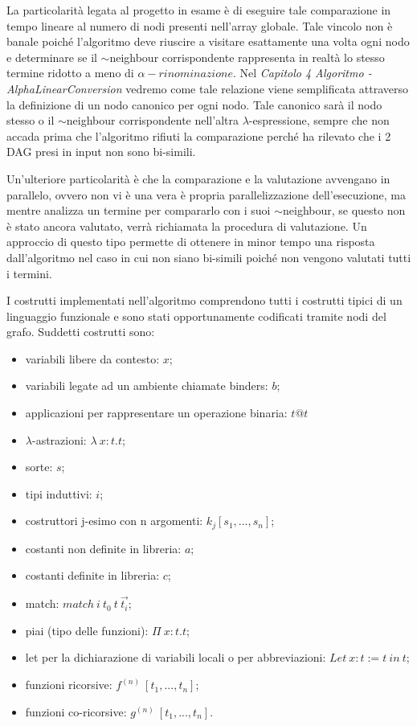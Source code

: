 \documentclass[12pt,a4paper,openright,twoside]{report}
\begin{document}
La particolarit\`a legata al progetto in esame \`e di eseguire tale comparazione in tempo lineare al numero di nodi presenti nell'array globale. Tale vincolo non \`e banale poich\'e l'algoritmo deve riuscire a visitare esattamente una volta ogni nodo e determinare se il $\sim$neighbour corrispondente rappresenta in realt\`a lo stesso termine ridotto a meno di $\alpha-rinominazione$. Nel \textit{Capitolo 4 Algoritmo - AlphaLinearConversion} vedremo come tale relazione viene semplificata attraverso la definizione di un nodo canonico per ogni nodo. Tale canonico sar\`a il nodo stesso o il $\sim$neighbour corrispondente nell'altra $\lambda$-espressione, sempre che non accada prima che l'algoritmo rifiuti la comparazione perch\'e ha rilevato che i 2 DAG presi in input non sono bi-simili.\newline

Un'ulteriore particolarit\`a \`e che la comparazione e la valutazione avvengano in parallelo, ovvero non vi \`e una vera \`e propria parallelizzazione dell'esecuzione, ma mentre analizza un termine per compararlo con i suoi $\sim$neighbour, se questo non \`e stato ancora valutato, verr\`a richiamata la procedura di valutazione. Un approccio di questo tipo permette di ottenere in minor tempo una risposta dall'algoritmo nel caso in cui non siano bi-simili poich\'e non vengono valutati tutti i termini.\newline

I costrutti implementati nell'algoritmo comprendono tutti i costrutti tipici di un linguaggio funzionale e sono stati opportunamente codificati tramite nodi del grafo. Suddetti costrutti sono:
\begin{itemize}                         %
\item variabili libere da contesto: $x$;
\item variabili legate ad un ambiente chiamate binders: $b$;
\item applicazioni per rappresentare un operazione binaria: $t@t$
\item $\lambda$-astrazioni: $\lambda\>x:t.t$;
\item sorte: $s$;
\item tipi induttivi: $i$;
\item costruttori j-esimo con n argomenti: $k_j[s_1, ..., s_n]$;
\item costanti non definite in libreria: $a$;
\item costanti definite in libreria: $c$;
\item match: $match\> i\> t_0\> t\> \Vec{t_{i}}$;
\item piai (tipo delle funzioni): $\Pi\> x:t.t$;
\item let per la dichiarazione di variabili locali o per abbreviazioni: \newline$Let\> x:t:=t\> in\> t$;
\item funzioni ricorsive: $f^{(n)}\> [t_1, ..., t_n]$;
\item funzioni co-ricorsive: $g^{(n)}\> [t_1, ..., t_n]$.
\end{itemize}
\end{document}
